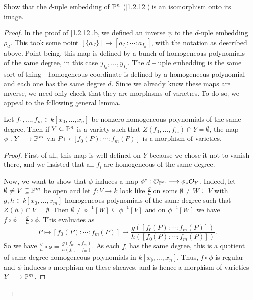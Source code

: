 \label{1.3.4}                                                                            

Show that the $d$-uple embedding of $\P^n$ (\ref{1.2.12}) is an isomorphism onto its image.

\begin{proof}
    In the proof of \ref{1.2.12}.b, we defined an inverse $\psi$ to the $d$-uple embedding $\rho_d$. This took some point $[\{a_J\}] \mapsto [a_{I_0} : \cdots : a_{I_n}]$, with the notation as described above. Point being, this map is defined by a bunch of homogeneous polynomials of the same degree, in this case $y_{I_0}, \dots, y_{I_n}$. The $d-$uple embedding is the same sort of thing - homogeneous coordinate is defined by a homogeneous polynomial and each one has the same degree $d$. Since we already know these maps are inverse, we need only check that they are morphisms of varieties. To do so, we appeal to the following general lemma.

    \begin{lemma}
        Let $f_1, \dots, f_m \in k[x_0, \dots, x_n]$ be nonzero homogeneous polynomials of the same degree. Then if $Y \subseteq \P^n$ is a variety such that $Z(f_0, \dots, f_m) \cap Y = \emptyset$, the map $\phi: Y \longrightarrow \P^m$ via $P \mapsto [f_0(P) : \cdots : f_m(P)]$ is a morphism of varieties.
    \end{lemma}
    \begin{proof}
        First of all, this map is well defined on $Y$ because we chose it not to vanish there, and we insisted that all $f_i$ are homogeneous of the same degree.

        Now, we want to show that $\phi$ induces a map $\phi^*: \mathcal O_{\P^m} \longrightarrow \phi_* \mathcal O_Y$. Indeed, let $\emptyset \neq V \subseteq \P^m$ be open and let $f: V \longrightarrow k$ look like $\frac{g}{h}$ on some $\emptyset \neq W \subseteq V$ with $g, h \in k[x_0, \dots, x_m]$ homogeneous polynomials of the same degree such that $Z(h) \cap V = \emptyset$. Then $\emptyset \neq \phi^{-1}[W] \subseteq \phi^{-1}[V]$ and on $\phi^{-1}[W]$ we have $f \circ \phi = \frac{g}{h} \circ \phi$. This evaluates as
        \[
            P \mapsto [f_0(P) : \cdots : f_m(P)] \mapsto \frac{g([f_0(P) : \cdots : f_m(P)])}{h([f_0(P) : \cdots : f_m(P)])}.
        \]
        So we have $\frac{g}{h} \circ \phi = \frac{g(f_0, \dots, f_m)}{h(f_0, \dots, f_m)}$. As each $f_i$ has the same degree, this is a quotient of same degree homogeneous polynomials in $k[x_0, \dots, x_n]$. Thus, $f \circ \phi$ is regular and $\phi$ induces a morphism on these sheaves, and is hence a morphism of varieties $Y \longrightarrow \P^m$.
    \end{proof}


\end{proof}
